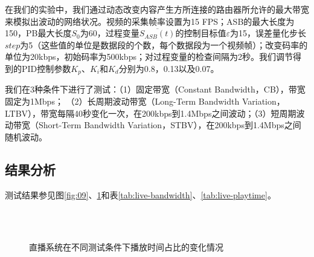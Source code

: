 在我们的实验中，我们通过动态改变内容产生方所连接的路由器所允许的最大带宽来模拟出波动的网络状况。视频的采集帧率设置为15 FPS；ASB的最大长度为150，PB最大长度$S_0$为60，过程变量$\overline{S_{ASB}(t)}$的控制目标值$\varepsilon$为15，误差量化步长$step$为5（这些值的单位是数据段的个数，每个数据段为一个视频帧）；改变码率的单位为20kbps，初始码率为500kbps；对过程变量的检查间隔为2秒。我们调节得到的PID控制参数$K_p$、$K_i$和$K_d$分别为0.8，0.13以及0.07。

我们在3种条件下进行了测试：（1）固定带宽（Constant Bandwidth，CB），带宽固定为1Mbps；
（2）长周期波动带宽（Long-Term Bandwidth Variation，LTBV），带宽每隔40秒变化一次，在200kbps到1.4Mbps之间波动；（3）短周期波动带宽（Short-Term Bandwidth Variation，STBV），在200kbps到1.4Mbps之间随机波动。

\subsection{结果分析}

测试结果参见图\ref{fig:09}、\ref{fig:14}和表\ref{tab:live-bandwidth}、\ref{tab:live-playtime}。

\begin{figure}[!t]
	\centering
	 \\
	 \\
	\caption{直播系统在不同测试条件下播放时间占比的变化情况}
	\label{fig:14}
\end{figure}

